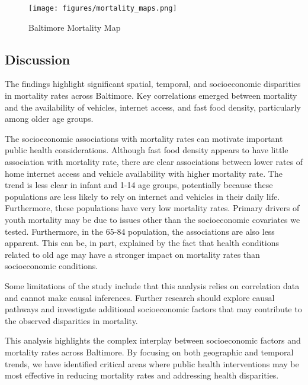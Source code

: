 \documentclass[
  letterpaper,
  DIV=11,
  numbers=noendperiod]{scrartcl}
\begin{document}
\begin{figure}

{\centering \texttt{[image: figures/mortality\_maps.png]}

}

\caption{\label{fig-9}Baltimore Mortality Map}

\end{figure}

\hypertarget{discussion}{%
\subsection{Discussion}\label{discussion}}

The findings highlight significant spatial, temporal, and socioeconomic
disparities in mortality rates across Baltimore. Key correlations
emerged between mortality and the availability of vehicles, internet
access, and fast food density, particularly among older age groups.

The socioeconomic associations with mortality rates can motivate
important public health considerations. Although fast food density
appears to have little association with mortality rate, there are clear
associations between lower rates of home internet access and vehicle
availability with higher mortality rate. The trend is less clear in
infant and 1-14 age groups, potentially because these populations are
less likely to rely on internet and vehicles in their daily life.
Furthermore, these populations have very low mortality rates. Primary
drivers of youth mortality may be due to issues other than the
socioeconomic covariates we tested. Furthermore, in the 65-84
population, the associations are also less apparent. This can be, in
part, explained by the fact that health conditions related to old age
may have a stronger impact on mortality rates than socioeconomic
conditions.

Some limitations of the study include that this analysis relies on
correlation data and cannot make causal inferences. Further research
should explore causal pathways and investigate additional socioeconomic
factors that may contribute to the observed disparities in mortality.

This analysis highlights the complex interplay between socioeconomic
factors and mortality rates across Baltimore. By focusing on both
geographic and temporal trends, we have identified critical areas where
public health interventions may be most effective in reducing mortality
rates and addressing health disparities.
\end{document}
